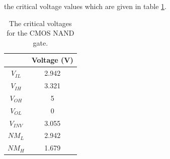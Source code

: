 \documentclass[titlepage, 12pt]{article}
\begin{document}
    the critical voltage values which are given in table
    \ref{tab:NAND_volt}.
    \begin{table}[H]
        \centering
        \caption{The critical voltages for the CMOS NAND gate.}
        \label{tab:NAND_volt}
        \begin{tabular}{c|c}
            & Voltage (V)\\
            \hline
            $V_{IL}$ & 2.942\\
            $V_{IH}$ & 3.321\\
            $V_{OH}$ & 5\\
            $V_{OL}$ & 0\\
            $V_{INV}$ & 3.055\\
            $NM_L$ & 2.942\\
            $NM_H$ & 1.679\\
        \end{tabular}
    \end{table}
\end{document}
